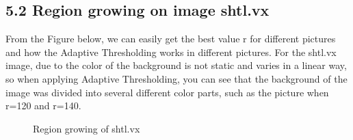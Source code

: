 \documentclass{article}
\begin{document}
\newpage
\subsection*{5.2 Region growing on image shtl.vx}
From the Figure below, we can easily get the best value r for different pictures and how the Adaptive Thresholding works in different pictures. For the shtl.vx image, due to the color of the background is not static and varies in a linear way, so when applying Adaptive Thresholding, you can see that the background of the image was divided into several different color parts, such as the picture when r=120 and r=140.
\begin{figure}[H]
\centering
{}%
%

%
%
\centering
\caption{ Region growing of shtl.vx}
\end{figure}
\end{document}
